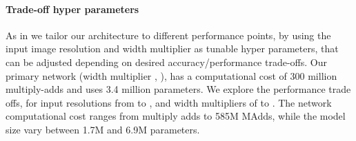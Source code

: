 \documentclass[10pt,twocolumn,letterpaper]{article}
\begin{document}
\begin{table}[t]
    \centering
\vspace{0pt}
\caption{
    The max number of channels/memory (in Kb) that needs to be materialized at each spatial resolution for different architectures.
    We assume 16-bit floats for activations.
    For \mbox{ShuffleNet}, we use  that matches the performance of \mbox{MobileNetV1} and \mbox{MobileNetV2}.
    For the first layer of  \mbox{MobileNetV2} and  \mbox{ShuffleNet} we can employ the trick described in Section~\ref{sec:implementation} to reduce memory requirement.
    Even though \mbox{ShuffleNet} employs bottlenecks elsewhere, the non-bottleneck tensors still need to be materialized due to the presence of shortcuts between the non-bottleneck tensors.
}
\label{tab:my_label}
\end{table}

\paragraph{Trade-off hyper parameters}
As in \cite{MobilenetV1} we tailor our architecture to different performance points, by using the input image resolution  and width multiplier as tunable hyper parameters, that can be adjusted depending on desired accuracy/performance trade-offs. Our primary network (width multiplier , ), has a computational cost of 300 million multiply-adds and uses 3.4 million parameters. We explore the performance trade offs, for input resolutions from  to , and width multipliers of  to .
The network computational cost ranges from  multiply adds to 585M MAdds, while the model size vary between 1.7M and 6.9M parameters.
\end{document}
